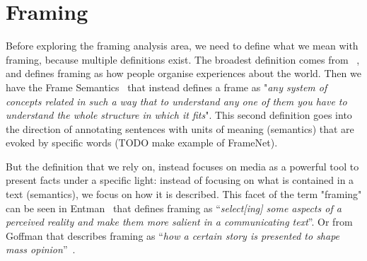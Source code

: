 
\section{Framing}
\label{sec:lit_framing}

Before exploring the framing analysis area, we need to define what we mean with framing, because multiple definitions exist.
The broadest definition comes from ~\cite{goffman1974frame}, and defines framing as how people organise experiences about the world.
Then we have the Frame Semantics~\cite{fillmore2006frame} that instead defines a frame as "\textit{any system of concepts related in such a way that to understand any one of them you have to understand the whole structure in which it fits}". This second definition goes into the direction of annotating sentences with units of meaning (semantics) that are evoked by specific words (TODO make example of FrameNet).

But the definition that we rely on, instead focuses on media as a powerful tool to present facts under a specific light: instead of focusing on what is contained in a text (semantics), we focus on how it is described. This facet of the term "framing" can be seen in
Entman~\cite{entman1993framing} that defines framing as ``\textit{select[ing] some aspects of a perceived reality and make them more salient in a communicating text}''.
Or from Goffman that describes framing as ``\textit{how a certain story is presented to shape mass opinion}''~\cite{goffman1974frame}.


